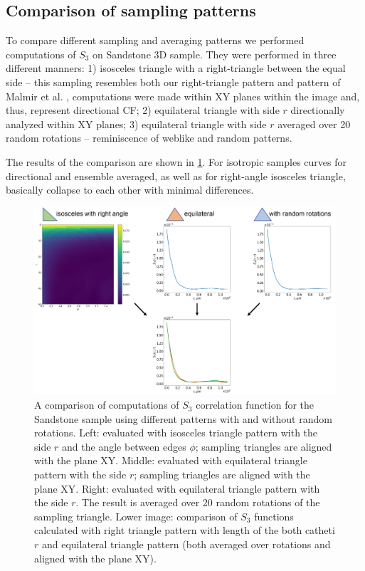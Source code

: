 \documentclass[reprint,amsmath,amssymb,aps,pre,showkeys,showpacs]{revtex4-1}
\begin{document}
\subsection{Comparison of sampling patterns}
\label{sec:compare_patterns}
To compare different sampling and averaging patterns we performed computations
of $S_3$ on Sandstone 3D sample.  They were performed in three different
manners: 1) isosceles triangle with a right-triangle between the equal side --
this sampling resembles both our right-triangle pattern and pattern of Malmir et
al. \cite{malmir2018}, computations were made within XY planes within the image
and, thus, represent directional CF; 2) equilateral triangle with side $r$
directionally analyzed within XY planes; 3) equilateral triangle with side $r$
averaged over 20 random rotations -- reminiscence of weblike and random
patterns.

The results of the comparison are shown in \cref{fig:comparison_patterns}. For
isotropic samples curves for directional and ensemble averaged, as well as for
right-angle isosceles triangle, basically collapse to each other with minimal
differences.
\begin{figure}[ht]
  \centering \includegraphics[width=0.8\linewidth]{images/fig_compar.png}
  \caption[]{A comparison of computations of $S_3$ correlation function for the
    Sandstone sample using different patterns with and without random
    rotations. Left: evaluated with isosceles triangle pattern with the side $r$
    and the angle between edges $\phi$; sampling triangles are aligned with the
    plane XY.  Middle: evaluated with equilateral triangle pattern with the side
    $r$; sampling triangles are aligned with the plane XY.  Right: evaluated
    with equilateral triangle pattern with the side $r$. The result is averaged
    over 20 random rotations of the sampling triangle. Lower image: comparison
    of $S_3$ functions calculated with right triangle pattern with length of the
    both catheti $r$ and equilateral triangle pattern (both averaged over
    rotations and aligned with the plane XY).}
  \label{fig:comparison_patterns}
\end{figure}
\end{document}
